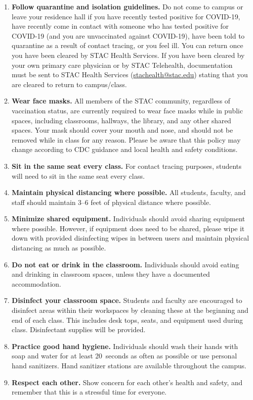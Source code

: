 \documentclass[11pt,letterpaper]{article}
\begin{document}
\begin{enumerate}[1.]
\item {\bfseries Follow quarantine and isolation guidelines.} Do not come to campus or leave your residence hall if you have recently tested positive for COVID-19, have recently come in contact with someone who has tested positive for COVID-19 (and you are unvaccinated against COVID-19), have been told to quarantine as a result of contact tracing, or you feel ill. You can return once you have been cleared by STAC Health Services. If you have been cleared by your own primary care physician or by STAC Telehealth, documentation must be sent to STAC Health Services (\href{mailto:stachealth@stac.edu}{stachealth@stac.edu}) stating that you are cleared to return to campus/class.

\item {\bfseries Wear face masks.} All members of the STAC community, regardless of vaccination status, are currently required to wear face masks while in public spaces, including classrooms, hallways, the library, and any other shared spaces. Your mask should cover your mouth and nose, and should not be removed while in class for any reason. Please be aware that this policy may change according to CDC guidance and local health and safety conditions. 

\item {\bfseries Sit in the same seat every class.} For contact tracing purposes, students will need to sit in the same seat every class.

\item {\bfseries Maintain physical distancing where possible.} All students, faculty, and staff should maintain 3--6 feet of physical distance where possible. 

\item {\bfseries Minimize shared equipment.} Individuals should avoid sharing equipment where possible. However, if equipment does need to be shared, please wipe it down with provided disinfecting wipes in between users and maintain physical distancing as much as possible.

\item {\bfseries Do not eat or drink in the classroom.} Individuals should avoid eating and drinking in classroom spaces, unless they have a documented accommodation.

\item {\bfseries Disinfect your classroom space.} Students and faculty are encouraged to disinfect areas within their workspaces by cleaning these at the beginning and end of each class. This includes desk tops, seats, and equipment used during class. Disinfectant supplies will be provided. 

\item {\bfseries Practice good hand hygiene.} Individuals should wash their hands with soap and water for at least 20~seconds as often as possible or use personal hand sanitizers. Hand sanitizer stations are available throughout the campus.

\item {\bfseries Respect each other.} Show concern for each other's health and safety, and remember that this is a stressful time for everyone.
\end{enumerate}
\end{document}
